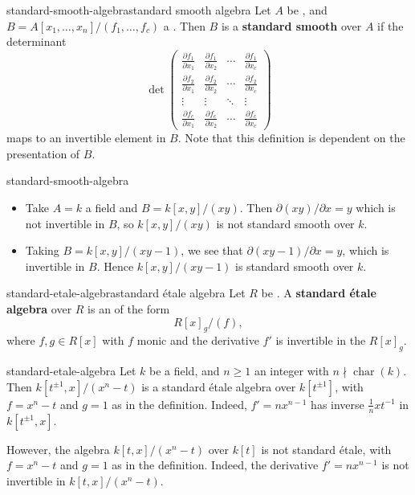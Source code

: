 \begin{topic}{standard-smooth-algebra}{standard smooth algebra}
    Let $A$ be , and $B = A[x_1, \ldots, x_n] / (f_1, \ldots, f_c)$ a . Then $B$ is a \textbf{standard smooth} over $A$ if the determinant
    \[ \det \begin{pmatrix}
        \frac{\partial f_1}{\partial x_1} & \frac{\partial f_1}{\partial x_2} & \cdots & \frac{\partial f_1}{\partial x_c} \\
        \frac{\partial f_2}{\partial x_1} & \frac{\partial f_2}{\partial x_2} & \cdots & \frac{\partial f_2}{\partial x_c} \\ 
        \vdots & \vdots & \ddots & \vdots \\ 
        \frac{\partial f_c}{\partial x_1} & \frac{\partial f_c}{\partial x_2} & \cdots & \frac{\partial f_c}{\partial x_c}
    \end{pmatrix} \]
    maps to an invertible element in $B$. Note that this definition is dependent on the presentation of $B$.
\end{topic}

\begin{example}{standard-smooth-algebra}
    \begin{itemize}
        \item Take $A = k$ a field and $B = k[x, y] / (xy)$. Then $\partial (xy) / \partial x = y$ which is not invertible in $B$, so $k[x, y] / (xy)$ is not standard smooth over $k$.
        \item Taking $B = k[x, y] / (xy - 1)$, we see that $\partial (xy - 1) / \partial x = y$, which is invertible in $B$. Hence $k[x, y] / (xy - 1)$ is standard smooth over $k$.
    \end{itemize}
\end{example}

\begin{topic}{standard-etale-algebra}{standard étale algebra}
    Let $R$ be . A \textbf{standard étale algebra} over $R$ is an  of the form
    \[ R[x]_g / (f) , \]
    where $f, g \in R[x]$ with $f$ monic and the derivative $f'$ is invertible in the  $R[x]_g$.
\end{topic}

\begin{example}{standard-etale-algebra}
    Let $k$ be a field, and $n \ge 1$ an integer with $n \nmid \operatorname{char}(k)$. Then $k[t^{\pm 1}, x] / (x^n - t)$ is a standard étale algebra over $k[t^{\pm 1}]$, with $f = x^n - t$ and $g = 1$ as in the definition. Indeed, $f' = n x^{n - 1}$ has inverse $\tfrac{1}{n} x t^{-1}$ in $k[t^{\pm 1}, x]$.
    
    However, the algebra $k[t, x] / (x^n - t)$ over $k[t]$ is not standard étale, with $f = x^n - t$ and $g = 1$ as in the definition. Indeed, the derivative $f' = n x^{n - 1}$ is not invertible in $k[t, x] / (x^n - t)$.
\end{example}

